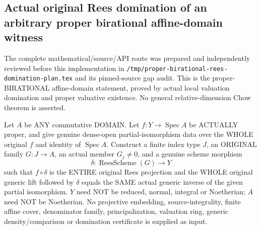 \subsection{Actual original Rees domination of an arbitrary proper birational affine-domain witness}

The complete mathematical/source/API route was prepared and independently
reviewed before this implementation in
\texttt{/tmp/proper-birational-rees-domination-plan.tex} and its pinned-source
gap audit.  This is the proper-BIRATIONAL affine-domain statement, proved by
actual local valuation domination and proper valuative existence.  No general
relative-dimension Chow theorem is asserted.

\begin{theorem}
\label{scheme:actual-proper-birational-original-rees-domination}
\leanok
{}
Let $A$ be ANY commutative DOMAIN.  Let $f:Y\to\operatorname{Spec}A$ be
ACTUALLY proper, and give genuine dense-open partial-isomorphism data over
the WHOLE original $f$ and identity of $\operatorname{Spec}A$.  Construct a
finite index type $J$, an ORIGINAL family $G:J\to A$, an actual member
$G_j\ne0$, and a genuine scheme morphism
\[
 \delta:\operatorname{ReesScheme}(G)\longrightarrow Y
\]
such that $f\circ\delta$ is the ENTIRE original Rees projection and the
WHOLE original generic lift followed by $\delta$ equals the SAME actual
generic inverse of the given partial isomorphism.  $Y$ need NOT be reduced,
normal, integral or Noetherian; $A$ need NOT be Noetherian.  No projective
embedding, source-integrality, finite affine cover, denominator family,
principalization, valuation ring, generic density/comparison or domination
certificate is supplied as input.
\end{theorem}
